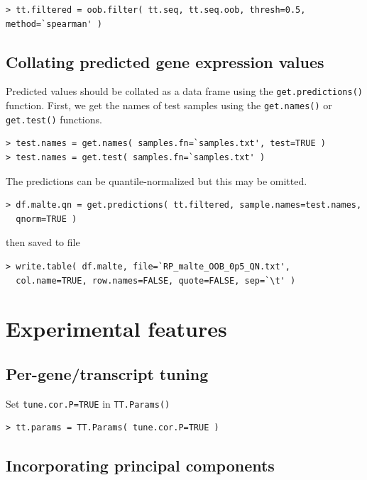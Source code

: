 \documentclass[a4paper,12pt]{article}
\begin{document}
\begin{verbatim}
> tt.filtered = oob.filter( tt.seq, tt.seq.oob, thresh=0.5, method=`spearman' )
\end{verbatim}

\subsection{Collating predicted gene expression values}
\label{usecase:collating}

Predicted values should be collated as a data frame using the \texttt{get.predictions()} function. First, we get the names of test samples using the \texttt{get.names()} or \texttt{get.test()} functions.

\begin{verbatim}
> test.names = get.names( samples.fn=`samples.txt', test=TRUE )
> test.names = get.test( samples.fn=`samples.txt' )
\end{verbatim}

The predictions can be quantile-normalized but this may be omitted.
	
\begin{verbatim}
> df.malte.qn = get.predictions( tt.filtered, sample.names=test.names, 
  qnorm=TRUE )
\end{verbatim}

then saved to file

\begin{verbatim}
> write.table( df.malte, file=`RP_malte_OOB_0p5_QN.txt', 
  col.name=TRUE, row.names=FALSE, quote=FALSE, sep=`\t' )
\end{verbatim}

\pagebreak
\section{Experimental features}
\label{experimental}

\subsection{Per-gene/transcript tuning}
\label{experimental:tuning}

Set \texttt{tune.cor.P=TRUE} in \texttt{TT.Params()}

\begin{verbatim}
> tt.params = TT.Params( tune.cor.P=TRUE )
\end{verbatim}

\subsection{Incorporating principal components}
\label{experimental:princomp}
\end{document}
